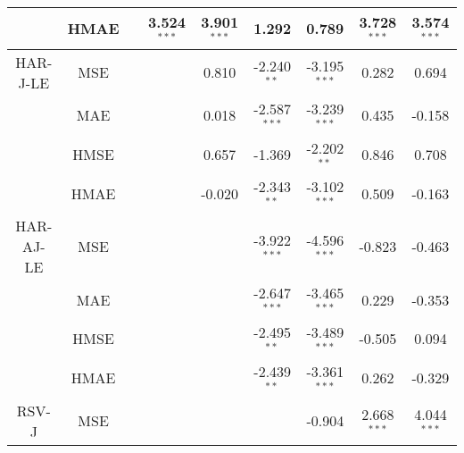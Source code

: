 \documentclass[10pt]{article}
\begin{document}
\begin{landscape}
\begin{center}
\begin{tabular}{c|c|ccccccc}
                        &  HMAE          &                    &3.524$^{\ast \ast \ast}$&3.901$^{\ast \ast \ast}$  &1.292                      &0.789                          &3.728$^{\ast \ast \ast}$&3.574$^{\ast \ast \ast}$            \\  \hline 
HAR-J-LE        &  MSE             &                    &                                 &0.810                        &-2.240$^{ \ast \ast}$     &-3.195$^{\ast \ast \ast}$&0.282                        &0.694            \\
                       &  MAE            &                    &                                 &0.018                         &-2.587$^{\ast \ast \ast}$&-3.239$^{\ast \ast \ast}$&0.435                       &-0.158            \\
                       &  HMSE          &                    &                                 &0.657                         &-1.369                         &-2.202$^{ \ast \ast}$       &0.846                       &0.708             \\
                       &  HMAE          &                    &                                 &-0.020                        &-2.343$^{ \ast \ast}$    &-3.102$^{\ast \ast \ast}$&0.509                         &-0.163            \\  \hline
HAR-AJ-LE      &  MSE            &                    &                                   &                                &-3.922$^{\ast \ast \ast}$&-4.596$^{\ast \ast \ast}$ &-0.823                      &-0.463             \\
                       &  MAE            &                    &                                 &                                 &-2.647$^{\ast \ast \ast}$&-3.465$^{\ast \ast \ast}$ &0.229                        &-0.353           \\
                       &  HMSE          &                    &                                  &                                &-2.495$^{\ast \ast}$       &-3.489$^{\ast \ast \ast}$ &-0.505                         &0.094             \\
                       &  HMAE          &                    &                                 &                                 &-2.439$^{\ast \ast}$       &-3.361$^{\ast \ast \ast}$ &0.262                         &-0.329           \\  \hline 
RSV-J              &  MSE            &                    &                                 &                                 &                                   &-0.904                           &2.668$^{\ast \ast \ast}$&4.044$^{\ast \ast \ast}$             \\

\end{tabular}
\end{center}
\end{landscape}
\end{document}
